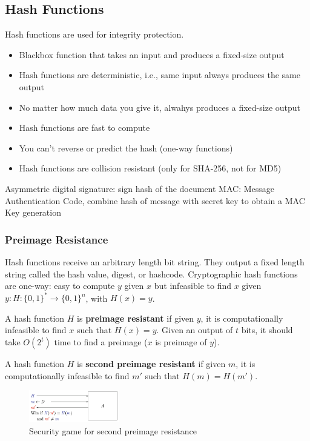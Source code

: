 \subsection{Hash Functions}
Hash functions are used for integrity protection. 
\begin{itemize}
    \item Blackbox function that takes an input and produces a fixed-size output
    \item Hash functions are deterministic, i.e., same input always produces the same output
    \item No matter how much data you give it, alwahys produces a fixed-size output
    \item Hash functions are fast to compute
    \item You can't reverse or predict the hash (one-way functions)
    \item Hash functions are collision resistant (only for SHA-256, not for MD5)
\end{itemize}

Asymmetric digital signature: sign hash of the document
MAC: Message Authentication Code, combine hash of message with secret key to obtain a MAC
Key generation

\subsubsection{Preimage Resistance}
Hash functions receive an arbitrary length bit string. They output a fixed length string called the hash value, digest, or hashcode. Cryptographic hash functions are one-way: easy to compute $y$ given $x$ but infeasible to find $x$ given $y: H: \{0,1\}^* \rightarrow \{0,1\}^n$, with $H(x) = y$.

\begin{defn}
    A hash function $H$ is \textbf{preimage resistant} if given $y$, it is computationally infeasible to find $x$ such that $H(x) = y$.
    Given an output of $t$ bits, it should take $O(2^t)$ time to find a preimage ($x$ is preimage of $y$).
\end{defn}

\begin{defn}
    A hash function $H$ is \textbf{second preimage resistant} if given $m$, it is computationally infeasible to find $m'$ such that $H(m) = H(m')$.
\end{defn}

\begin{figure}[h!]
    \centering
    \includegraphics[width=0.35\textwidth]{img/2ndpreimage.png}
    \caption{Security game for second preimage resistance}
\end{figure}

